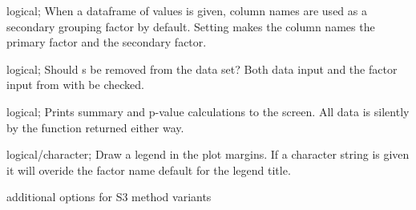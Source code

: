 \documentclass[a4paper]{book}
\begin{document}
\begin{Arguments}
\begin{ldescription}
\item[\code{flipFacts}] logical; When a dataframe of values is given, column names are used as a secondary grouping factor by default. Setting  makes the column names the primary factor and  the secondary factor.

\item[\code{na.rm}] logical; Should s be removed from the data set? Both data input and the factor input from  with be checked.

\item[\code{verbose}] logical; Prints summary and p-value calculations to the screen. All data is silently by the function returned either way.

\item[\code{legend}] logical/character; Draw a legend in the plot margins. If a character string is given it will overide the factor name default for the legend title.

\item[\code{...}] additional options for S3 method variants
\end{ldescription}
\end{Arguments}
%
\end{document}
